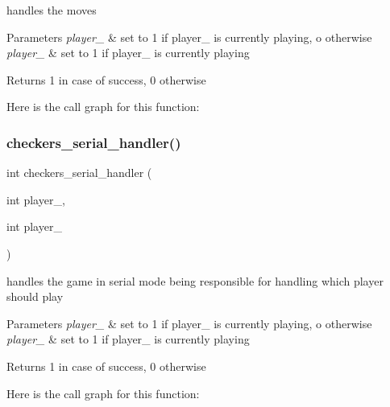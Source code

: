handles the moves 


\begin{DoxyParams}{Parameters}
{\em player\+\_} & set to 1 if player\+\_ is currently playing, o otherwise \\
\hline
{\em player\+\_} & set to 1 if player\+\_ is currently playing \\
\hline
\end{DoxyParams}
\begin{DoxyReturn}{Returns}
1 in case of success, 0 otherwise 
\end{DoxyReturn}
Here is the call graph for this function\+:
\hypertarget{group___checkers_gaf1aa642150939b8b1d104fe437a9d135}{}\label{group___checkers_gaf1aa642150939b8b1d104fe437a9d135} 
\subsubsection{\texorpdfstring{checkers\+\_\+serial\+\_\+handler()}{checkers\_serial\_handler()}}
{\footnotesize\ttfamily int checkers\+\_\+serial\+\_\+handler (\begin{DoxyParamCaption}\item[{int}]{player\+\_,  }\item[{int}]{player\+\_ }\end{DoxyParamCaption})}



handles the game in serial mode being responsible for handling which player should play 


\begin{DoxyParams}{Parameters}
{\em player\+\_} & set to 1 if player\+\_ is currently playing, o otherwise \\
\hline
{\em player\+\_} & set to 1 if player\+\_ is currently playing \\
\hline
\end{DoxyParams}
\begin{DoxyReturn}{Returns}
1 in case of success, 0 otherwise 
\end{DoxyReturn}
Here is the call graph for this function\+:
\hypertarget{group___checkers_gad95d8a331ab0758ace223ea301a57f7f}{}\label{group___checkers_gad95d8a331ab0758ace223ea301a57f7f} 
